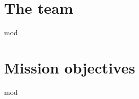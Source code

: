 \documentclass[class=report, crop=false]{standalone}
\begin{document}
\section{The team}
	{mod}
\section{Mission objectives}
	{mod}
\end{document}
